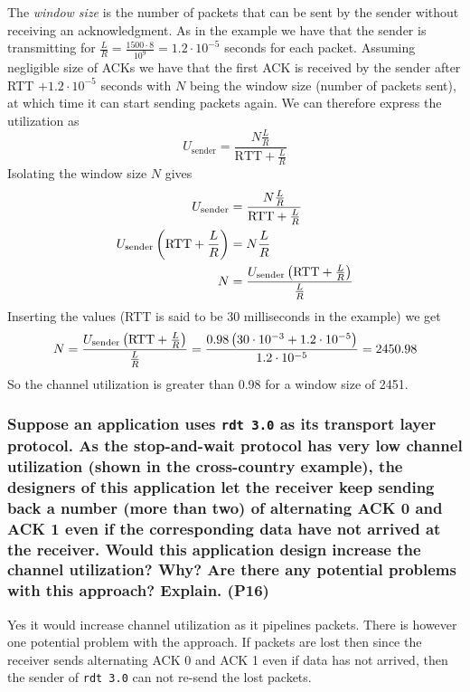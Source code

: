 The \textit{window size} is the number of packets that can be sent by the sender without receiving an acknowledgment. As in the example we have that the sender is transmitting for $\frac{L}{R} = \frac{1500 \cdot 8}{10^9} = 1.2 \cdot 10^{-5}$ seconds for each packet. Assuming negligible size of ACKs we have that the first ACK is received by the sender after RTT $+ 1.2 \cdot 10^{-5}$ seconds with $N$ being the window size (number of packets sent), at which time it can start sending packets again. We can therefore express the utilization as
\begin{equation*}
    U_{\text{sender}} = \frac{N \frac{L}{R}}{\text{RTT} + \frac{L}{R}}
\end{equation*} 
Isolating the window size $N$ gives
\begin{equation*}
\begin{split}
    U_{\text{sender}} &= \frac{N \frac{L}{R}}{\text{RTT} + \frac{L}{R}} \\
    U_{\text{sender}} \left (\text{RTT} + \frac{L}{R}\right) &= N \frac{L}{R} \\
    N &= \frac{U_{\text{sender}} \left (\text{RTT} + \frac{L}{R}\right)}{\frac{L}{R}}
\end{split}
\end{equation*}
Inserting the values (RTT is said to be 30 milliseconds in the example) we get
\begin{equation*}
    N = \frac{U_{\text{sender}} \left (\text{RTT} + \frac{L}{R}\right)}{\frac{L}{R}} = \frac{ 0.98 \left (30 \cdot 10^{-3} + 1.2 \cdot 10^{-5}\right)}{1.2 \cdot 10^{-5}} = 2450.98
\end{equation*}
So the channel utilization is greater than 0.98 for a window size of 2451.



\subsubsection{Suppose an application uses \texttt{rdt 3.0} as its transport layer protocol. As the stop-and-wait protocol has very low channel utilization (shown in the cross-country example), the designers of this application let the receiver keep sending back a number (more than two) of alternating ACK 0 and ACK 1 even if the corresponding data have not arrived at the receiver. Would this application design increase the channel utilization? Why? Are there any potential problems with this approach? Explain. (P16)}

Yes it would increase channel utilization as it pipelines packets. There is however one potential problem with the approach. If packets are lost then since the receiver sends alternating ACK 0 and ACK 1 even if data has not arrived, then the sender of \texttt{rdt 3.0} can not re-send the lost packets.



